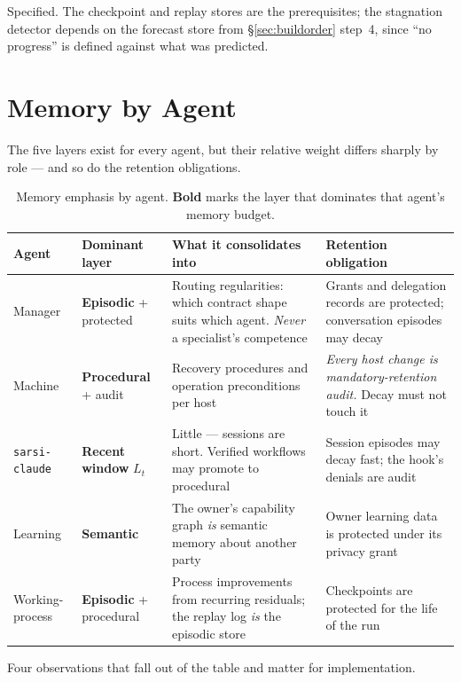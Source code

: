 \documentclass[11pt]{article}
\newcommand{\code}[1]{\texttt{\small #1}}
\begin{document}
Specified. The checkpoint and replay stores are the prerequisites; the stagnation detector depends on the forecast store from \S\ref{sec:buildorder} step~4, since ``no progress'' is defined against what was predicted.

\section{Memory by Agent}
\label{sec:memoryagent}

The five layers exist for every agent, but their relative weight differs sharply by role --- and so do the retention obligations.

\begin{table}[h]
\centering\small
\caption{Memory emphasis by agent. \textbf{Bold} marks the layer that dominates that agent's memory budget.}
\label{tab:memagent}
\begin{tabular}{@{}L{2.0cm}L{3.3cm}L{4.1cm}L{4.1cm}@{}}
\toprule
\textbf{Agent} & \textbf{Dominant layer} & \textbf{What it consolidates into} & \textbf{Retention obligation} \\
\midrule
Manager & \textbf{Episodic} + protected & Routing regularities: which contract shape suits which agent. \emph{Never} a specialist's competence & Grants and delegation records are protected; conversation episodes may decay \\
Machine & \textbf{Procedural} + audit & Recovery procedures and operation preconditions per host & \emph{Every host change is mandatory-retention audit.} Decay must not touch it \\
\code{sarsi-} \code{claude} & \textbf{Recent window} $L_t$ & Little --- sessions are short. Verified workflows may promote to procedural & Session episodes may decay fast; the hook's denials are audit \\
Learning & \textbf{Semantic} & The owner's capability graph \emph{is} semantic memory about another party & Owner learning data is protected under its privacy grant \\
Working-process & \textbf{Episodic} + procedural & Process improvements from recurring residuals; the replay log \emph{is} the episodic store & Checkpoints are protected for the life of the run \\
\bottomrule
\end{tabular}
\end{table}

Four observations that fall out of the table and matter for implementation.
\end{document}
